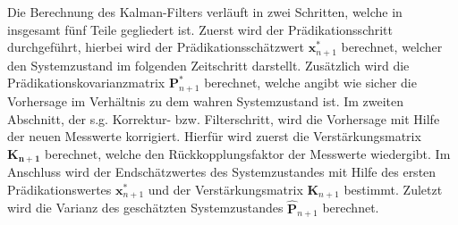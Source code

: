 Die Berechnung des Kalman-Filters verläuft in zwei Schritten, welche in insgesamt fünf Teile gegliedert ist. Zuerst wird der Prädikationsschritt durchgeführt, hierbei wird der Prädikationsschätzwert $\boldsymbol{x}^*_{n+1}$ berechnet, welcher den Systemzustand im folgenden Zeitschritt darstellt. Zusätzlich wird die Prädikationskovarianzmatrix $\boldsymbol{P}^*_{n+1}$ berechnet, welche angibt wie sicher die Vorhersage im Verhältnis zu dem wahren Systemzustand ist.
Im zweiten Abschnitt, der s.g. Korrektur- bzw. Filterschritt, wird die Vorhersage mit Hilfe der neuen Messwerte korrigiert. Hierfür wird zuerst die Verstärkungsmatrix $\boldsymbol{K_{n+1}}$ berechnet, welche den Rückkopplungsfaktor der Messwerte wiedergibt. Im Anschluss wird der Endschätzwertes des Systemzustandes mit Hilfe des ersten Prädikationswertes $\boldsymbol{x}^*_{n+1}$ und der Verstärkungsmatrix $\boldsymbol{K}_{n+1}$ bestimmt. Zuletzt wird die Varianz des geschätzten Systemzustandes $\hat{\boldsymbol{P}}_{n+1}$ berechnet.

